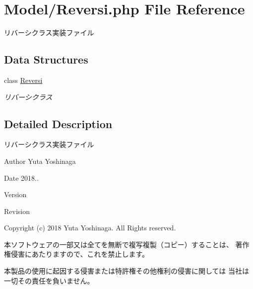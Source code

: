 \hypertarget{_reversi_8php}{}\section{Model/\+Reversi.php File Reference}
\label{_reversi_8php}


リバーシクラス実装ファイル  


\subsection*{Data Structures}
\begin{DoxyCompactItemize}
\item 
class \hyperlink{class_reversi}{Reversi}
\begin{DoxyCompactList}\small\item\em リバーシクラス \end{DoxyCompactList}\end{DoxyCompactItemize}


\subsection{Detailed Description}
リバーシクラス実装ファイル 

\begin{DoxyAuthor}{Author}
Yuta Yoshinaga 
\end{DoxyAuthor}
\begin{DoxyDate}{Date}
2018.. 
\end{DoxyDate}
\begin{DoxyParagraph}{Version}

\end{DoxyParagraph}
\begin{DoxyParagraph}{Revision}

\end{DoxyParagraph}


Copyright (c) 2018 Yuta Yoshinaga. All Rights reserved.


\begin{DoxyItemize}
\item 本ソフトウェアの一部又は全てを無断で複写複製（コピー）することは、 著作権侵害にあたりますので、これを禁止します。
\item 本製品の使用に起因する侵害または特許権その他権利の侵害に関しては 当社は一切その責任を負いません。 
\end{DoxyItemize}
